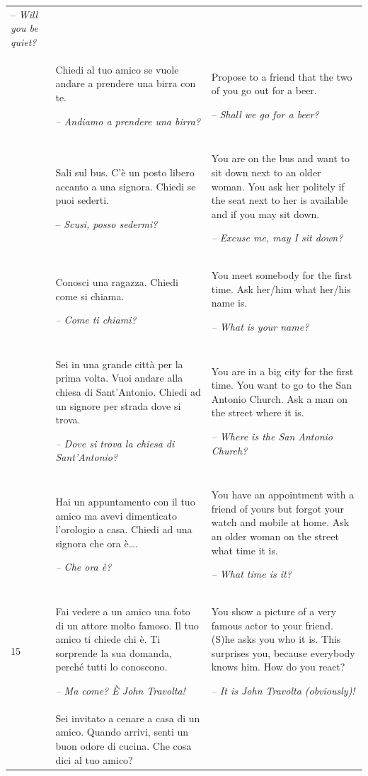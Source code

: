 \begin{xltabular}{\textwidth}{lQQ}
-- \textit{Will you be quiet?}\\
 & Chiedi al tuo amico se vuole andare a prendere una birra con te.

{\itshape -- Andiamo a prendere una birra?} & Propose to a friend that the two of you go out for a beer.

-- \textit{Shall we go for a beer?}\\
 & Sali sul bus. C'è un posto libero accanto a una signora. Chiedi se puoi sederti.

-- \textit{Scusi, posso sedermi?} & You are on the bus and want to sit down next to an older woman. You ask her politely if the seat next to her is available and if you may sit down.

{\itshape -- Excuse me, may I sit down?}\\
 & Conosci una ragazza. Chiedi come si chiama.

{\itshape -- Come ti chiami?} & You meet somebody for the first time. Ask her/him what her/his name is.

{\itshape -- What is your name?}\\
 & Sei in una grande città per la prima volta. Vuoi andare alla chiesa di Sant’Antonio. Chiedi ad un signore per strada dove si trova.

{\itshape -- Dove si trova la chiesa di Sant’Antonio?} & You are in a big city for the first time. You want to go to the San Antonio Church. Ask a man on the street where it is.

{\itshape -- Where is the San Antonio Church?}\\
 & Hai un appuntamento con il tuo amico ma avevi dimenticato l'orologio a casa. Chiedi ad una signora che ora è….

\textit{-- Che ora è?} & You have an appointment with a friend of yours but forgot your watch and mobile at home. Ask an older woman on the street what time it is.

{\itshape -- What time is it?}\\
15 & Fai vedere a un amico una foto di un attore molto famoso. Il tuo amico ti chiede chi è. Ti sorprende la sua domanda, perché tutti lo conoscono.

{\itshape -- Ma come? È John Travolta!} & You show a picture of a very famous actor to your friend. (S)he asks you who it is. This surprises you, because everybody knows him. How do you react?

{\itshape -- It is John Travolta (obviously)!}\\
 & Sei invitato a cenare a casa di un amico. Quando arrivi, senti un buon odore di cucina. Che cosa dici al tuo amico?


\end{xltabular}
